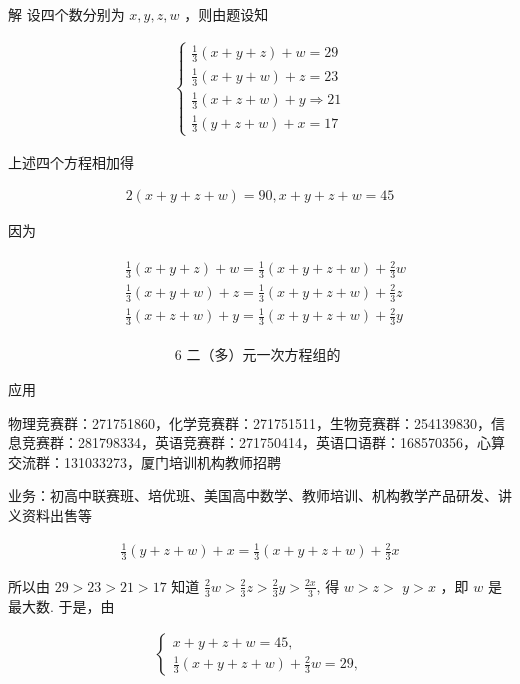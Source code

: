 \documentclass[10pt]{article}
\begin{document}
解 设四个数分别为 $x, y, z, w$ ，则由题设知

\begin{align*}
\left\{\begin{array}{l}
\frac{1}{3}(x+y+z)+w=29 \\
\frac{1}{3}(x+y+w)+z=23 \\
\frac{1}{3}(x+z+w)+y \Rightarrow 21 \\
\frac{1}{3}(y+z+w)+x=17
\end{array}\right.
\end{align*}

上述四个方程相加得

\begin{align*}
2(x+y+z+w)=90, x+y+z+w=45
\end{align*}

因为

\begin{align*}
\begin{aligned}
& \frac{1}{3}(x+y+z)+w=\frac{1}{3}(x+y+z+w)+\frac{2}{3} w \\
& \frac{1}{3}(x+y+w)+z=\frac{1}{3}(x+y+z+w)+\frac{2}{3} z \\
& \frac{1}{3}(x+z+w)+y=\frac{1}{3}(x+y+z+w)+\frac{2}{3} y
\end{aligned}
\end{align*}

\begin{align*}
6 \text { 二（多）元一次方程组的 }
\end{align*}

应用

物理竞赛群：271751860，化学竞赛群：271751511，生物竞赛群：254139830，信息竞赛群：281798334，英语竞赛群：271750414，英语口语群：168570356，心算交流群：131033273，厦门培训机构教师招聘

业务：初高中联赛班、培优班、美国高中数学、教师培训、机构教学产品研发、讲义资料出售等

\begin{align*}
\frac{1}{3}(y+z+w)+x=\frac{1}{3}(x+y+z+w)+\frac{2}{3} x
\end{align*}

所以由 $29>23>21>17$ 知道 $\frac{2}{3} w>\frac{2}{3} z>\frac{2}{3} y>\frac{2 x}{3}$, 得 $w>z>$ $y>x$ ，即 $w$ 是最大数. 于是，由

\begin{align*}
\left\{\begin{array}{l}
x+y+z+w=45, \\
\frac{1}{3}(x+y+z+w)+\frac{2}{3} w=29,
\end{array}\right.
\end{align*}
\end{document}
